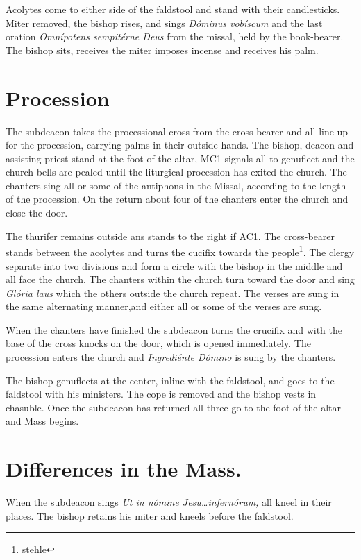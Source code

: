 {\rubric Acolytes come to either side of the faldstool and stand with their
candlesticks. Miter removed, the bishop rises, and sings \textit{Dóminus
vobíscum} and the last oration \textit{Omnípotens sempitérne Deus} from the
missal, held by the book-bearer. The bishop sits, receives the miter imposes
incense and receives his palm.

\section{Procession}

\rubric The subdeacon takes the processional cross from the cross-bearer and
all line up for the procession, carrying palms in their outside hands. The
bishop, deacon and assisting priest stand at the foot of the altar, MC1 signals
all to genuflect and the church bells are pealed until the liturgical
procession has exited the church. The chanters sing all or some of the
antiphons in the Missal, according to the length of the procession. On the
return about four of the chanters enter the church and close the door.

\rubric The thurifer remains outside ans stands to the right if AC1. The
cross-bearer stands between the acolytes and turns the cucifix towards the
people\footnote[][147, p. 170.]{stehle}. The clergy separate into two divisions
and form a circle with the bishop in the middle and all face the church. The
chanters within the church turn toward the door and sing \textit{Glória laus}
which the others outside the church repeat. The verses are sung in the same
alternating manner,and either all or some of the verses are sung.

\rubric When the chanters have finished the subdeacon turns the crucifix and
with the base of the cross knocks on the door, which is opened immediately. The
procession enters the church  and \textit{Ingrediénte Dómino} is sung by the
chanters.

\rubric The bishop genuflects at the center, inline with the faldstool, and
goes to the faldstool with his ministers. The cope is removed and the bishop
vests in chasuble. Once the subdeacon has returned all three go to the foot of
the altar and Mass begins.

\section{Differences in the Mass.}

\rubric When the subdeacon sings \textit{Ut in nómine Jesu\dots infernórum,}
all kneel in their places. The bishop retains his miter and kneels before the
faldstool.

}

